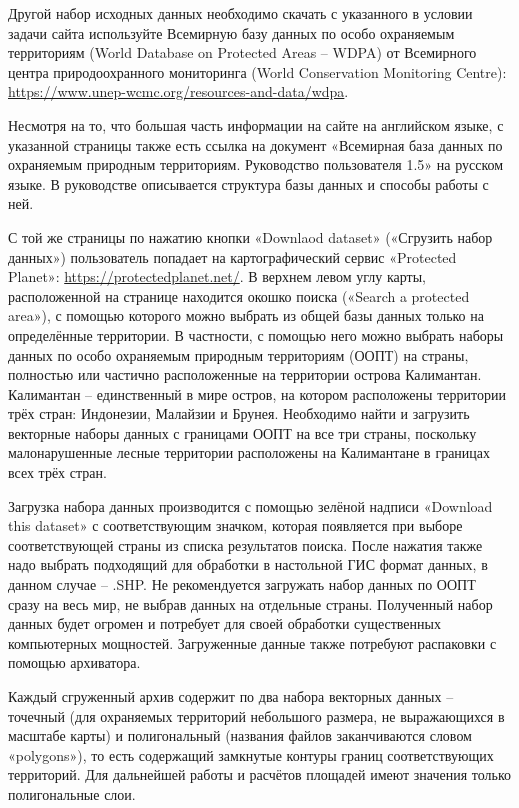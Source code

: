 Другой набор исходных данных необходимо скачать с указанного в условии задачи сайта используйте Всемирную базу данных по особо охраняемым территориям (World Database on Protected Areas – WDPA) от Всемирного центра природоохранного мониторинга (World Conservation Monitoring Centre): \url{https://www.unep-wcmc.org/resources-and-data/wdpa}.

Несмотря на то, что большая часть информации на сайте на английском языке, с указанной страницы также есть ссылка на документ «Всемирная база данных по охраняемым природным территориям. Руководство пользователя 1.5» на русском языке. В руководстве описывается структура базы данных и способы работы с ней.

С той же страницы по нажатию кнопки «Downlaod dataset» («Сгрузить набор данных») пользователь попадает на картографический сервис «Protected Planet»: \url{https://protectedplanet.net/}. В верхнем левом углу карты, расположенной на странице находится окошко поиска («Search a protected area»), с помощью которого можно выбрать из общей базы данных только на определённые территории. В частности, с помощью него можно выбрать наборы данных по особо охраняемым природным территориям (ООПТ) на страны, полностью или частично расположенные на территории острова Калимантан. Калимантан – единственный в мире остров, на котором расположены территории трёх стран: Индонезии, Малайзии и Брунея. Необходимо найти и загрузить векторные наборы данных с границами ООПТ на все три страны, поскольку малонарушенные лесные территории расположены на Калимантане в границах всех трёх стран.

Загрузка набора данных производится с помощью зелёной надписи «Download this dataset» с соответствующим значком, которая появляется при выборе соответствующей страны из списка результатов поиска. После нажатия также надо выбрать подходящий для обработки в настольной ГИС формат данных, в данном случае – .SHP. Не рекомендуется загружать набор данных по ООПТ сразу на весь мир, не выбрав данных на отдельные страны. Полученный набор данных будет огромен и потребует для своей обработки существенных компьютерных мощностей. Загруженные данные также потребуют распаковки с помощью архиватора.

Каждый сгруженный архив содержит по два набора векторных данных – точечный (для охраняемых территорий небольшого размера, не выражающихся в масштабе карты) и полигональный (названия файлов заканчиваются словом «polygons»), то есть содержащий замкнутые контуры границ соответствующих территорий. Для дальнейшей работы и расчётов площадей имеют значения только полигональные слои.

